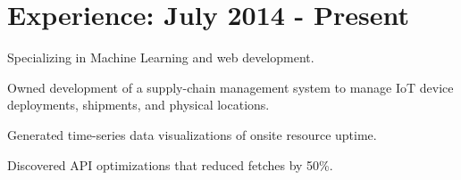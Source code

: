 \documentclass[]{deedy-resume-openfont}
\begin{document}
\hfill
\begin{minipage}[t]{0.66\textwidth}


\section{Experience: July 2014 - Present}
\sectionsep

\vspace{\topsep}
\begin{tightemize}

\item Specializing in Machine Learning and web development.

\end{tightemize}
\sectionsep


\vspace{\topsep}
\begin{tightemize}

\item Owned development of a supply-chain management system to manage IoT device deployments, shipments, and physical locations.
\item Generated time-series data visualizations of onsite resource uptime.
\item Discovered API optimizations that reduced fetches by 50\%.

\end{tightemize}
\sectionsep


\begin{tightemize}



\end{tightemize}
\end{minipage}
\end{document}
